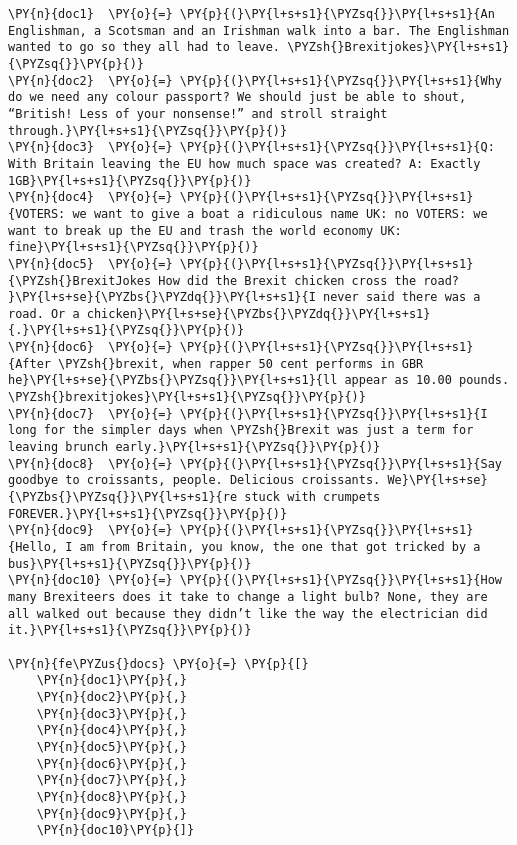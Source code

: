     \begin{tcolorbox}[breakable, size=fbox, boxrule=1pt, pad at break*=1mm,colback=cellbackground, colframe=cellborder]
\begin{Verbatim}[commandchars=\\\{\}]
\PY{n}{doc1}  \PY{o}{=} \PY{p}{(}\PY{l+s+s1}{\PYZsq{}}\PY{l+s+s1}{An Englishman, a Scotsman and an Irishman walk into a bar. The Englishman wanted to go so they all had to leave. \PYZsh{}Brexitjokes}\PY{l+s+s1}{\PYZsq{}}\PY{p}{)}
\PY{n}{doc2}  \PY{o}{=} \PY{p}{(}\PY{l+s+s1}{\PYZsq{}}\PY{l+s+s1}{Why do we need any colour passport? We should just be able to shout, “British! Less of your nonsense!” and stroll straight through.}\PY{l+s+s1}{\PYZsq{}}\PY{p}{)}
\PY{n}{doc3}  \PY{o}{=} \PY{p}{(}\PY{l+s+s1}{\PYZsq{}}\PY{l+s+s1}{Q: With Britain leaving the EU how much space was created? A: Exactly 1GB}\PY{l+s+s1}{\PYZsq{}}\PY{p}{)}
\PY{n}{doc4}  \PY{o}{=} \PY{p}{(}\PY{l+s+s1}{\PYZsq{}}\PY{l+s+s1}{VOTERS: we want to give a boat a ridiculous name UK: no VOTERS: we want to break up the EU and trash the world economy UK: fine}\PY{l+s+s1}{\PYZsq{}}\PY{p}{)}
\PY{n}{doc5}  \PY{o}{=} \PY{p}{(}\PY{l+s+s1}{\PYZsq{}}\PY{l+s+s1}{\PYZsh{}BrexitJokes How did the Brexit chicken cross the road? }\PY{l+s+se}{\PYZbs{}\PYZdq{}}\PY{l+s+s1}{I never said there was a road. Or a chicken}\PY{l+s+se}{\PYZbs{}\PYZdq{}}\PY{l+s+s1}{.}\PY{l+s+s1}{\PYZsq{}}\PY{p}{)}
\PY{n}{doc6}  \PY{o}{=} \PY{p}{(}\PY{l+s+s1}{\PYZsq{}}\PY{l+s+s1}{After \PYZsh{}brexit, when rapper 50 cent performs in GBR he}\PY{l+s+se}{\PYZbs{}\PYZsq{}}\PY{l+s+s1}{ll appear as 10.00 pounds. \PYZsh{}brexitjokes}\PY{l+s+s1}{\PYZsq{}}\PY{p}{)}
\PY{n}{doc7}  \PY{o}{=} \PY{p}{(}\PY{l+s+s1}{\PYZsq{}}\PY{l+s+s1}{I long for the simpler days when \PYZsh{}Brexit was just a term for leaving brunch early.}\PY{l+s+s1}{\PYZsq{}}\PY{p}{)}
\PY{n}{doc8}  \PY{o}{=} \PY{p}{(}\PY{l+s+s1}{\PYZsq{}}\PY{l+s+s1}{Say goodbye to croissants, people. Delicious croissants. We}\PY{l+s+se}{\PYZbs{}\PYZsq{}}\PY{l+s+s1}{re stuck with crumpets FOREVER.}\PY{l+s+s1}{\PYZsq{}}\PY{p}{)}
\PY{n}{doc9}  \PY{o}{=} \PY{p}{(}\PY{l+s+s1}{\PYZsq{}}\PY{l+s+s1}{Hello, I am from Britain, you know, the one that got tricked by a bus}\PY{l+s+s1}{\PYZsq{}}\PY{p}{)}
\PY{n}{doc10} \PY{o}{=} \PY{p}{(}\PY{l+s+s1}{\PYZsq{}}\PY{l+s+s1}{How many Brexiteers does it take to change a light bulb? None, they are all walked out because they didn’t like the way the electrician did it.}\PY{l+s+s1}{\PYZsq{}}\PY{p}{)}

\PY{n}{fe\PYZus{}docs} \PY{o}{=} \PY{p}{[}
    \PY{n}{doc1}\PY{p}{,}
    \PY{n}{doc2}\PY{p}{,}
    \PY{n}{doc3}\PY{p}{,}
    \PY{n}{doc4}\PY{p}{,}
    \PY{n}{doc5}\PY{p}{,}
    \PY{n}{doc6}\PY{p}{,}
    \PY{n}{doc7}\PY{p}{,}
    \PY{n}{doc8}\PY{p}{,}
    \PY{n}{doc9}\PY{p}{,}
    \PY{n}{doc10}\PY{p}{]}
\end{Verbatim}
\end{tcolorbox}

